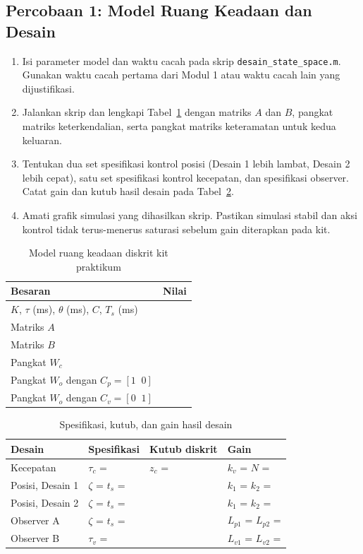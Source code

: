 \documentclass[11pt,a4paper]{article}
\newcommand{\prog}[1]{\texttt{#1}}
\begin{document}
\subsection{Percobaan 1: Model Ruang Keadaan dan Desain}
\begin{enumerate}
\item Isi parameter model dan waktu cacah pada skrip \prog{desain\_state\_space.m}. Gunakan waktu cacah pertama dari Modul 1 atau waktu cacah lain yang dijustifikasi.
\item Jalankan skrip dan lengkapi Tabel~\ref{tab:p1_model} dengan matriks $A$ dan $B$, pangkat matriks keterkendalian, serta pangkat matriks keteramatan untuk kedua keluaran.
\item Tentukan dua set spesifikasi kontrol posisi (Desain 1 lebih lambat, Desain 2 lebih cepat), satu set spesifikasi kontrol kecepatan, dan spesifikasi observer. Catat gain dan kutub hasil desain pada Tabel~\ref{tab:p1_gain}.
\item Amati grafik simulasi yang dihasilkan skrip. Pastikan simulasi stabil dan aksi kontrol tidak terus-menerus saturasi sebelum gain diterapkan pada kit.
\end{enumerate}

\begin{table}[H]
\centering
\caption{Model ruang keadaan diskrit kit praktikum}
\label{tab:p1_model}
\begin{tabularx}{\textwidth}{|l|X|}
\hline
\textbf{Besaran} & \textbf{Nilai} \\
\hline
$K$, $\tau$ (ms), $\theta$ (ms), $C$, $T_s$ (ms) & \\
Matriks $A$ & \\
Matriks $B$ & \\
Pangkat $W_c$ & \\
Pangkat $W_o$ dengan $C_p = [1\;\;0]$ & \\
Pangkat $W_o$ dengan $C_v = [0\;\;1]$ & \\
\hline
\end{tabularx}
\end{table}

\begin{table}[H]
\centering
\caption{Spesifikasi, kutub, dan gain hasil desain}
\label{tab:p1_gain}
\small
\begin{tabularx}{\textwidth}{|l|X|X|X|}
\hline
\textbf{Desain} & \textbf{Spesifikasi} & \textbf{Kutub diskrit} & \textbf{Gain} \\
\hline
Kecepatan & $\tau_c$ = & $z_c$ = & $k_v$ = \quad $N$ = \\
Posisi, Desain 1 & $\zeta$ = \quad $t_s$ = & & $k_1$ = \quad $k_2$ = \\
Posisi, Desain 2 & $\zeta$ = \quad $t_s$ = & & $k_1$ = \quad $k_2$ = \\
Observer A & $\zeta$ = \quad $t_s$ = & & $L_{p1}$ = \quad $L_{p2}$ = \\
Observer B & $\tau_v$ = & & $L_{v1}$ = \quad $L_{v2}$ = \\
\hline
\end{tabularx}
\end{table}
\end{document}
